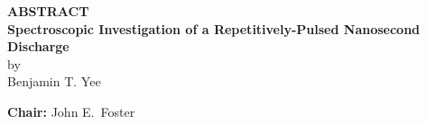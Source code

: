 \documentclass[12pt]{article}
\begin{document}
\pagestyle{empty}
\begin{center}
  \textbf{\large ABSTRACT} \\
  \vspace{2em}
  \textbf{Spectroscopic Investigation of a Repetitively-Pulsed
    Nanosecond Discharge} \\
  \vspace{1em}
  by \\
  \vspace{1em}
  Benjamin T. Yee
\end{center}
\vspace{1em}
\textbf{Chair:} John E.\ Foster
\vspace{2em}

  
\end{document}
